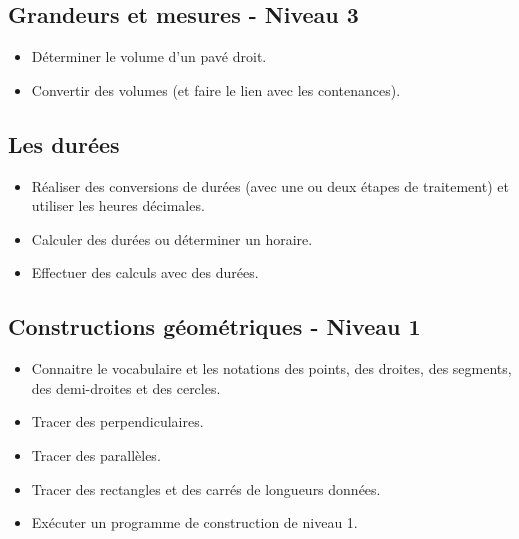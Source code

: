 \documentclass[a4paper,12pt,fleqn]{article}
\begin{document}
\subsection*{Grandeurs et mesures - Niveau 3}

\begin{itemize}[itemsep=1em]
	\item {}Déterminer le volume d’un pavé droit.
	\item {}Convertir des volumes (et faire le lien avec les contenances).
\end{itemize}

\subsection*{Les durées}

\begin{itemize}[itemsep=1em]
	\item {}Réaliser des conversions de durées (avec une ou deux étapes de traitement) et utiliser les heures décimales.
	\item {}Calculer des durées ou déterminer un horaire.
	\item {}Effectuer des calculs avec des durées.
\end{itemize}

\newpage


\subsection*{Constructions géométriques - Niveau 1}

\begin{itemize}[itemsep=1em]
	\item {}Connaitre le vocabulaire et les notations des points, des droites, des segments, des demi-droites et des cercles. 
	\item {}Tracer des perpendiculaires.
	\item {}Tracer des parallèles.
	\item {}Tracer des rectangles et des carrés de longueurs données.
	\item {}Exécuter un programme de construction de niveau 1.
\end{itemize}
\end{document}
